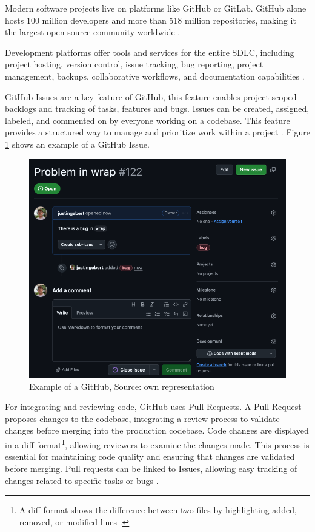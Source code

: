 Modern software projects live on platforms like GitHub or GitLab. GitHub alone hosts 100 million developers and more than 518 million repositories, making it the largest open-source community worldwide \cite{staffOctoverseAILeads2024}.

Development platforms offer tools and services for the entire \ac{SDLC}, including project hosting, version control, issue tracking, bug reporting, project management, backups, collaborative workflows, and documentation capabilities \cite{GitHubFeatures2025, abrahamssonAgileSoftwareDevelopment2017}.

GitHub Issues are a key feature of GitHub, this feature enables project-scoped backlogs and tracking of tasks, features and bugs. Issues can be created, assigned, labeled, and commented on by everyone working on a codebase. This feature provides a structured way to manage and prioritize work within a project \cite{Issues}. Figure \ref{fig:gh-issue} shows an example of a GitHub Issue.

\begin{figure}[H]
    \centering
    \includegraphics[width=1\textwidth]{images/github/github_issue.png}
    \caption{Example of a GitHub, Source: own representation}
    \label{fig:gh-issue}
\end{figure}

For integrating and reviewing code, GitHub uses Pull Requests. A Pull Request proposes changes to the codebase, integrating a review process to validate changes before merging into the production codebase. Code changes are displayed in a diff format\footnote{A diff format shows the difference between two files by highlighting added, removed, or modified lines \cite{WhatDiffUnderstanding}.}, allowing reviewers to examine the changes made. This process is essential for maintaining code quality and ensuring that changes are validated before merging. Pull requests can be linked to Issues, allowing easy tracking of changes related to specific tasks or bugs \cite{PullRequests}.

